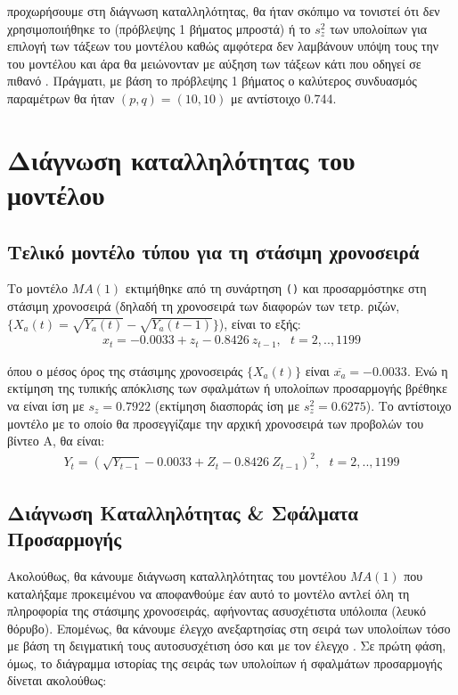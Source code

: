  προχωρήσουμε στη διάγνωση καταλληλότητας, θα ήταν σκόπιμο να τονιστεί ότι δεν χρησιμοποιήθηκε το  (πρόβλεψης 1 βήματος μπροστά) ή το $s_z^2$ των υπολοίπων για επιλογή των τάξεων του μοντέλου καθώς αμφότερα δεν λαμβάνουν υπόψη τους την  του μοντέλου και άρα θα μειώνονταν με αύξηση των τάξεων κάτι που οδηγεί σε πιθανό . Πράγματι, με βάση το  πρόβλεψης 1 βήματος ο καλύτερος συνδυασμός παραμέτρων θα ήταν $(p,q) = (10,10)$ με αντίστοιχο  0.744.


\section{Διάγνωση καταλληλότητας του μοντέλου }

\subsection{Τελικό μοντέλο τύπου  για τη στάσιμη χρονοσειρά}

Το μοντέλο $MA(1)$ εκτιμήθηκε από τη συνάρτηση \texttt{()} και προσαρμόστηκε στη στάσιμη χρονοσειρά (δηλαδή τη χρονοσειρά των διαφορών των τετρ. ριζών, $\{X_a(t)=\sqrt{Y_a(t)}-\sqrt{Y_a(t-1)}\}$), είναι το εξής:
\begin{align}
x_t = -0.0033 + z_t - 0.8426 \  z_{t-1}, \ \ \  t=2,..,1199
\label{eq:xa_model}
\end{align}

όπου ο μέσος όρος της στάσιμης χρονοσειράς $\{X_a(t)\}$ είναι $\overline{x_a}=-0.0033$. Ενώ η εκτίμηση της τυπικής απόκλισης των σφαλμάτων ή υπολοίπων προσαρμογής βρέθηκε να είναι ίση με \textbf{$s_z = 0.7922$} (εκτίμηση διασποράς ίση με $s_z^2 = 0.6275$). Το αντίστοιχο μοντέλο με το οποίο θα προσεγγίζαμε την αρχική χρονοσειρά των προβολών του βίντεο Α, θα είναι:
\begin{align}
Y_t = \left(\sqrt{Y_{t-1}} -0.0033 + Z_t - 0.8426 \ Z_{t-1} \right)^2, \ \ \  t=2,..,1199
\label{eq:ya_model}
\end{align}

\subsection{Διάγνωση Καταλληλότητας \& Σφάλματα Προσαρμογής}

Ακολούθως, θα κάνουμε διάγνωση καταλληλότητας του μοντέλου $MA(1)$ που καταλήξαμε προκειμένου να αποφανθούμε έαν αυτό το μοντέλο αντλεί όλη τη πληροφορία της στάσιμης χρονοσειράς, αφήνοντας ασυσχέτιστα υπόλοιπα (λευκό θόρυβο). Επομένως, θα κάνουμε έλεγχο ανεξαρτησίας στη σειρά των υπολοίπων τόσο με βάση τη δειγματική τους αυτοσυσχέτιση όσο και με τον έλεγχο . Σε πρώτη φάση, όμως, το διάγραμμα ιστορίας της σειράς των υπολοίπων ή σφαλμάτων προσαρμογής δίνεται ακολούθως:

